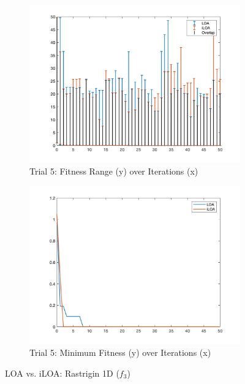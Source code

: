 \begin{figure}
  \begin{subfigure}[b]{0.4\textwidth}
    \includegraphics[width=\textwidth]{img/bars/f3/5}
    \caption{ \scriptsize Trial 5: Fitness Range (y) over Iterations (x)}
    \label{fig:f3-b-5}
  \end{subfigure}
  \begin{subfigure}[b]{0.4\textwidth}
    \includegraphics[width=\textwidth]{img/fits/f3/5}
    \caption{ \scriptsize Trial 5: Minimum Fitness (y) over Iterations (x)}
    \label{fig:f3-f-5}
  \end{subfigure}

  \caption{ \scriptsize LOA vs. iLOA: Rastrigin 1D ($f_3$)}
\end{figure}
